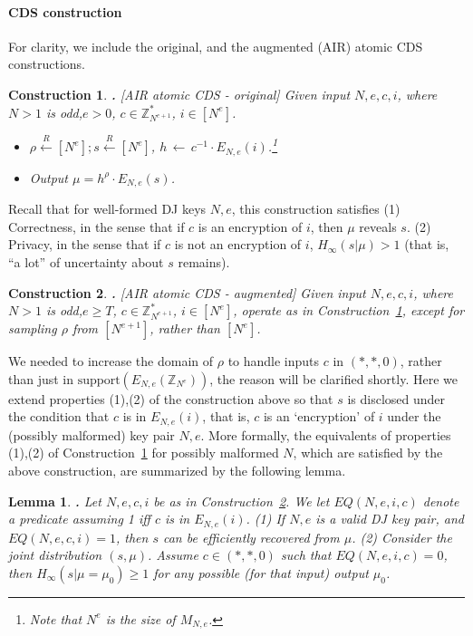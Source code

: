 \documentclass{article}
\newcommand{\encr}[2]{E_{#1}(#2)}
\newcommand{\encdj}{{E}_{N,e}}
\newcommand{\support}{{\mathrm{support}}}
\newcommand{\plain}{{{M}}}
\newcommand{\plaintext}[1]{\plain_{#1}}
\newcommand{\Z}{{\mathbb{Z}}}
\newtheorem{LEMMA}{Lemma}[section]
\newenvironment{lemma}{\begin{LEMMA} \hspace{-.85em} {\bf .} \rm}%
	{\end{LEMMA}}
\newtheorem{CONSTRUCTION}{Construction}[section]
\newenvironment{construction}{\begin{CONSTRUCTION} \hspace{-.85em} {\bf .} \rm}%
	{\end{CONSTRUCTION}}
\newcommand{\from}{{\,\leftarrow\,}}
\newcommand{\samp}[2]{#1\from #2}
\newcommand{\usamp}[2]{#1\stackrel{R}{\leftarrow}#2}
\newcommand{\U}[1]{\mathbb{Z}_{#1}^*}
\begin{document}
\paragraph{CDS construction}
For clarity, we include the original, and the augmented (AIR) atomic CDS constructions.
\begin{construction}[AIR atomic CDS - original]
\label{con-air-cds-orig}
Given input $N,e,c,i$, where $N>1$ is odd,$e>0$, $c\in \U{N^{e+1}}$, $i\in [N^e]$.
\begin{itemize}
  \item $\usamp{\rho}{[N^e]};\usamp{s}{[N^e]}$, $\samp{h}{c^{-1}\cdot \encr{N,e}{i}}$.\footnote{Note that $N^e$
    is the size of $\plaintext{N,e}$.}
    \item Output $\mu=h^{\rho}\cdot\encr{N,e}{s}$.
  \end{itemize}
\end{construction}
Recall that for well-formed DJ keys $N,e$, this construction satisfies (1) Correctness, in the sense that if $c$ is an encryption
of $i$, then $\mu$ reveals $s$. (2) Privacy, in the sense that if $c$ is not an encryption of $i$, $H_\infty(s|\mu)>1$
(that is, ``a lot'' of uncertainty about $s$ remains).
\begin{construction}[AIR atomic CDS - augmented]
  \label{con-air-cds-aug}
  Given input $N,e,c,i$, where $N>1$ is odd,$e\geq T$, $c\in \U{N^{e+1}}$, $i\in [N^e]$,
  operate as in Construction~\ref{con-air-cds-orig}, except for sampling $\rho$ from $[N^{e+1}]$,
  rather than $[N^e]$.
\end{construction}
We needed to increase the domain of $\rho$ to handle inputs $c$ in
$(*,*,0)$, rather than just in $\support(\encdj(\Z_{N^e}))$, the
reason will be clarified shortly. Here we extend properties (1),(2) of the construction above so that
$s$ is disclosed under the condition that $c$ is in $\encdj(i)$, that is,
$c$ is an `encryption' of $i$ under the (possibly malformed) key
pair $N,e$. More formally, the equivalents of properties (1),(2) of Construction~\ref{con-air-cds-orig} 
for possibly malformed $N$, which are satisfied by the above
construction, are summarized by the following lemma.
\begin{lemma}
  \label{lem-air-cds-priv}
  Let $N,e,c,i$ be as in Construction~\ref{con-air-cds-aug}. We
  let $EQ(N,e,i,c)$ denote a predicate assuming 1 iff $c$ is in $\encdj(i)$.
  (1) If $N,e$ is a valid DJ key pair, and $EQ(N,e,c,i)=1$, then $s$ can be efficiently recovered from $\mu$.
  (2) Consider the joint distribution $(s,\mu)$. Assume $c\in (*,*,0)$ such that $EQ(N,e,i,c)=0$,
  then $H_{\infty}(s|\mu=\mu_0)\geq 1$ for any possible (for that input) output $\mu_0$.
\end{lemma}
\end{document}
